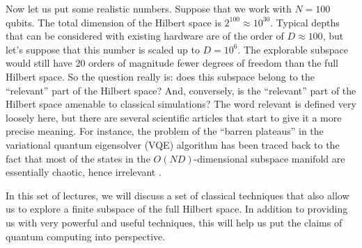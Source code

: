 \documentclass{SciPost}
\begin{document}
Now let us put some realistic numbers. Suppose that we work with $N=100$ qubits. The total dimension of the Hilbert space is $2^{100} \approx 10^{30}$. Typical depths that can be considered with existing hardware are of the order of $D\approx 100$, but let’s suppose that this number is scaled up to $D=10^6$. The explorable subspace would still have 20 orders of magnitude fewer degrees of freedom than the full Hilbert space. So the question really is: does this subspace belong to the ``relevant'' part of the Hilbert space? And, conversely, is the ``relevant'' part of the Hilbert space amenable to classical simulations? The word relevant is defined very loosely here, but there are several scientific articles that start to give it a more precise meaning. For instance, the problem of the ``barren plateaus'' in the variational quantum eigensolver (VQE) algorithm has been traced back to the fact that most of the states in the $O(N D)$-dimensional subspace manifold are essentially chaotic, hence irrelevant \cite{larocca2025}.

In this set of lectures, we will discuss a set of classical techniques that also allow us to explore a finite subspace of the full Hilbert space. In addition to providing us with very powerful and useful techniques, this will help us put the claims of quantum computing into perspective.
\end{document}

